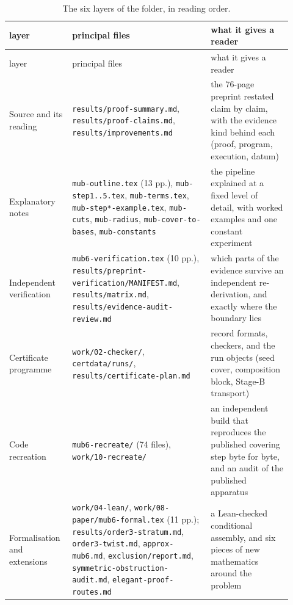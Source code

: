 \documentclass[10pt]{article}
\theoremstyle{definition}
\newcommand{\file}[1]{\texttt{\small #1}}
\begin{document}
{\small
\begin{longtable}{@{}L{0.19\linewidth}L{0.46\linewidth}L{0.27\linewidth}@{}}
\caption{The six layers of the folder, in reading order.}\label{tab:layers}\\
\toprule
layer & principal files & what it gives a reader \\
\midrule
\endfirsthead
\toprule
layer & principal files & what it gives a reader \\
\midrule
\endhead
Source and its reading & \file{results/\allowbreak{}proof-\allowbreak{}summary.md}, \file{results/\allowbreak{}proof-\allowbreak{}claims.md},
\file{results/\allowbreak{}improvements.md} & the 76-page preprint restated claim by claim, with the evidence
kind behind each (proof, program, execution, datum) \\
Explanatory notes & \file{mub-\allowbreak{}outline.tex} (13 pp.), \file{mub-\allowbreak{}step1..5.tex}, \file{mub-\allowbreak{}terms.tex},
\file{mub-\allowbreak{}step*-\allowbreak{}example.tex}, \file{mub-\allowbreak{}cuts}, \file{mub-\allowbreak{}radius}, \file{mub-\allowbreak{}cover-\allowbreak{}to-\allowbreak{}bases},
\file{mub-\allowbreak{}constants} & the pipeline explained at a fixed level of detail, with worked examples and
one constant experiment \\
Independent verification & \file{mub6-\allowbreak{}verification.tex} (10 pp.), \file{results/\allowbreak{}preprint-\allowbreak{}verification/\allowbreak{}MANIFEST.md},
\file{results/\allowbreak{}matrix.md}, \file{results/\allowbreak{}evidence-\allowbreak{}audit-\allowbreak{}review.md} & which parts of the evidence survive
an independent re-derivation, and exactly where the boundary lies \\
Certificate programme & \file{work/\allowbreak{}02-\allowbreak{}checker/\allowbreak{}}, \file{certdata/\allowbreak{}runs/\allowbreak{}}, \file{results/\allowbreak{}certificate-\allowbreak{}plan.md} &
record formats, checkers, and the run objects (seed cover, composition block, Stage-B transport) \\
Code recreation & \file{mub6-\allowbreak{}recreate/\allowbreak{}} (74 files), \file{work/\allowbreak{}10-\allowbreak{}recreate/\allowbreak{}} & an independent build
that reproduces the published covering step byte for byte, and an audit of the published apparatus \\
Formalisation and extensions & \file{work/\allowbreak{}04-\allowbreak{}lean/\allowbreak{}}, \file{work/\allowbreak{}08-\allowbreak{}paper/\allowbreak{}mub6-\allowbreak{}formal.tex} (11 pp.);
\file{results/\allowbreak{}order3-\allowbreak{}stratum.md}, \file{order3-\allowbreak{}twist.md}, \file{approx-\allowbreak{}mub6.md},
\file{exclusion/\allowbreak{}report.md}, \file{symmetric-\allowbreak{}obstruction-\allowbreak{}audit.md}, \file{elegant-\allowbreak{}proof-\allowbreak{}routes.md} &
a Lean-checked conditional assembly, and six pieces of new mathematics around the problem \\
\bottomrule
\end{longtable}
}
\end{document}
